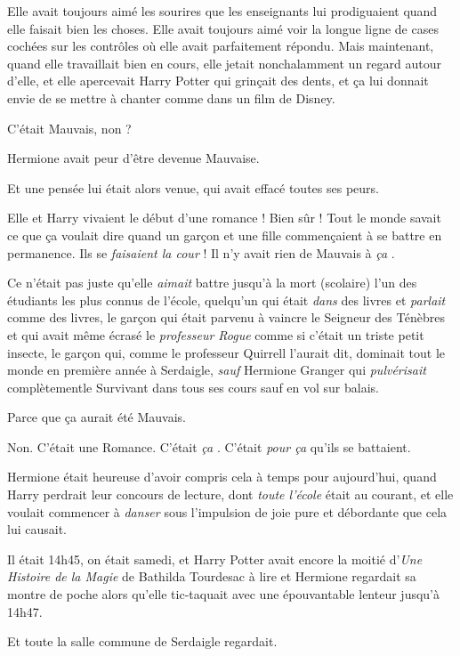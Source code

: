 Elle avait toujours aimé les sourires que les enseignants lui prodiguaient quand elle faisait bien les choses. Elle avait toujours aimé voir la longue ligne de cases cochées sur les contrôles où elle avait parfaitement répondu. Mais maintenant, quand elle travaillait bien en cours, elle jetait nonchalamment un regard autour d'elle, et elle apercevait Harry Potter qui grinçait des dents, et ça lui donnait envie de se mettre à chanter comme dans un film de Disney.

C'était Mauvais, non ?

Hermione avait peur d'être devenue Mauvaise.

Et une pensée lui était alors venue, qui avait effacé toutes ses peurs.

Elle et Harry vivaient le début d'une romance ! Bien sûr ! Tout le monde savait ce que ça voulait dire quand un garçon et une fille commençaient à se battre en permanence. Ils se \emph{faisaient la cour}  ! Il n'y avait rien de Mauvais à \emph{ça} .

Ce n'était pas juste qu'elle \emph{aimait}  battre jusqu'à la mort (scolaire) l'un des étudiants les plus connus de l'école, quelqu'un qui était \emph{dans}  des livres et \emph{parlait}  comme des livres, le garçon qui était parvenu à vaincre le Seigneur des Ténèbres et qui avait même écrasé le \emph{professeur Rogue}  comme si c'était un triste petit insecte, le garçon qui, comme le professeur Quirrell l'aurait dit, dominait tout le monde en première année à Serdaigle, \emph{sauf}  Hermione Granger qui \emph{pulvérisait } complètementle Survivant dans tous ses cours sauf en vol sur balais.

Parce que ça aurait été Mauvais.

Non. C'était une Romance. C'était \emph{ça} . C'était \emph{pour ça}  qu'ils se battaient.

Hermione était heureuse d'avoir compris cela à temps pour aujourd'hui, quand Harry perdrait leur concours de lecture, dont \emph{toute l'école}  était au courant, et elle voulait commencer à \emph{danser}  sous l'impulsion de joie pure et débordante que cela lui causait.

Il était 14h45, on était samedi, et Harry Potter avait encore la moitié d'\emph{Une Histoire de la Magie}  de Bathilda Tourdesac à lire et Hermione regardait sa montre de poche alors qu'elle tic-taquait avec une épouvantable lenteur jusqu'à 14h47.

Et toute la salle commune de Serdaigle regardait.

